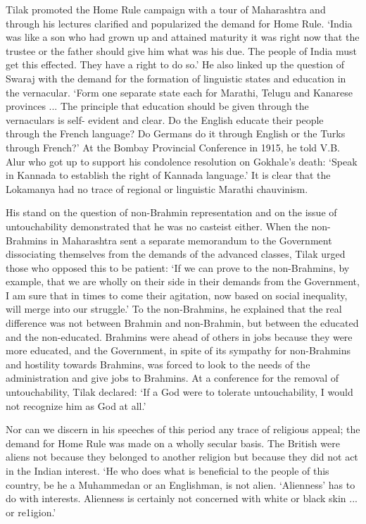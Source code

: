 Tilak promoted the Home Rule campaign with a tour of Maharashtra and through his lectures clarified and popularized the demand for Home Rule. `India was like a son who had grown up and attained maturity it was right now that the trustee or the father should give him what was his due. The people of India must get this effected. They have a right to do so.' He also linked up the question of Swaraj with the demand for the formation of linguistic states and education in the vernacular. `Form one separate state each for Marathi, Telugu and Kanarese provinces ... The principle that education should be given through the vernaculars is self- evident and clear. Do the English educate their people through the French language? Do Germans do it through English or the Turks through French?' At the Bombay Provincial Conference in 1915, he told V.B. Alur who got up to support his condolence resolution on Gokhale's death: `Speak in Kannada to establish the right of Kannada language.' It is clear that the Lokamanya had no trace of regional or linguistic Marathi chauvinism.

His stand on the question of non-Brahmin representation and on the issue of untouchability demonstrated that he was no casteist either. When the non-Brahmins in Maharashtra sent a separate memorandum to the Government dissociating themselves from the demands of the advanced classes, Tilak urged those who opposed this to be patient: `If we can prove to the non-Brahmins, by example, that we are wholly on their side in their demands from the Government, I am sure that in times to come their agitation, now based on social inequality, will merge into our struggle.' To the non-Brahmins, he explained that the real difference was not between Brahmin and non-Brahmin, but between the educated and the non-educated. Brahmins were ahead of others in jobs because they were more educated, and the Government, in spite of its sympathy for non-Brahmins and hostility towards Brahmins, was forced to look to the needs of the administration and give jobs to Brahmins. At a conference for the removal of untouchability, Tilak declared: `If a God were to tolerate untouchability, I would not recognize him as God at all.'

Nor can we discern in his speeches of this period any trace of religious appeal; the demand for Home Rule was made on a wholly secular basis. The British were aliens not because they belonged to another religion but because they did not act in the Indian interest. `He who does what is beneficial to the people of this country, be he a Muhammedan or an Englishman, is not alien. `Alienness' has to do with interests. Alienness is certainly not concerned with white or black skin ... or re1igion.'

